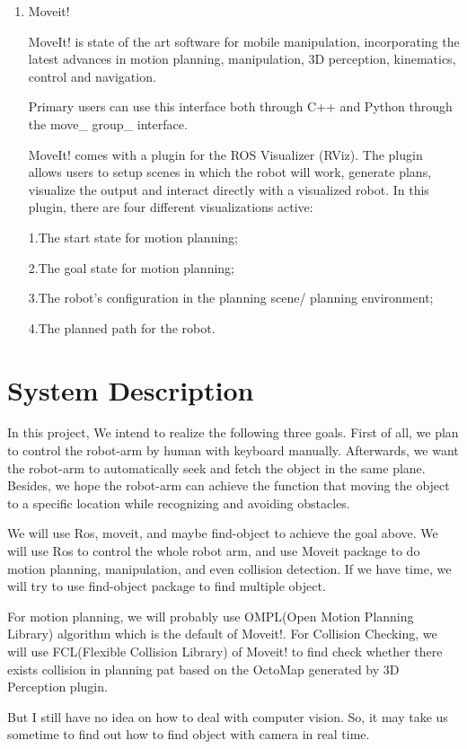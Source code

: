 \documentclass[paper=a4, fontsize=11pt]{scrartcl} %
\numberwithin{equation}{section} %
\numberwithin{figure}{section} %
\numberwithin{table}{section} %
\begin{document}
\begin{enumerate}
\item Moveit!

MoveIt! is state of the art software for mobile manipulation, incorporating the latest advances in motion planning, manipulation, 3D perception, kinematics, control and navigation. \par
Primary users can use this interface both through C++ and Python through the move\_ group\_ interface.\par
MoveIt! comes with a plugin for the ROS Visualizer (RViz). The plugin allows users to setup scenes in which the robot will work, generate plans, visualize the output and interact directly with a visualized robot. In this plugin, there are four  different visualizations active:\par
1.The start state for motion planning;\par
2.The goal state for motion planning;\par
3.The robot’s configuration in the planning scene/ planning environment;\par
4.The planned path for the robot.\par
\end{enumerate}

\section{System	Description}

In this project, We intend to realize the following three goals. First of all, we plan to control the robot-arm by human with keyboard manually. Afterwards, we want the robot-arm to automatically seek and fetch the object in the same plane. Besides, we hope the robot-arm can achieve the function that moving the object to a specific location while recognizing and avoiding obstacles.

We will use Ros, moveit, and maybe find-object to achieve the goal above. We will use Ros to control the whole robot arm, and use Moveit package to do motion planning, manipulation, and even collision detection. If we have time, we will try to use find-object package to find multiple object.

For motion planning, we will probably use OMPL(Open Motion Planning Library) algorithm which is the default of Moveit!. For Collision Checking, we will use FCL(Flexible Collision Library) of Moveit! to find check whether there exists collision in planning pat based on the OctoMap generated by 3D Perception plugin.

But I still have no idea on how to deal with computer vision. So, it may take us sometime to find out how to find object with camera in real time.
\end{document}
